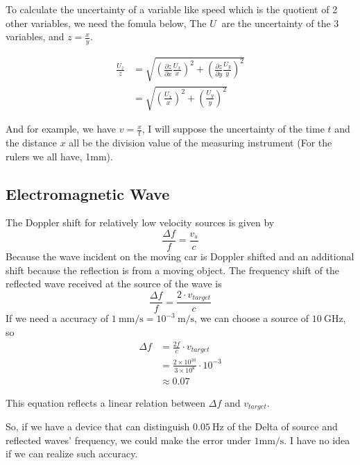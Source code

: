 \documentclass{article}
\begin{document}
To calculate the uncertainty of a variable like speed which is the quotient of 2 other variables, we need the fomula below,
The $U~$ are the uncertainty of the 3 variables, and $z = \frac{x}{y}$.


\begin{align}
    \frac{U_z}{z} & = \sqrt{ (\frac{\partial z}{\partial x} \frac{U_x}{x})^2 +  (\frac{\partial z}{\partial y} \frac{U_y}{y})^2} \label{fomula} \\
                  & = \sqrt{ ( \frac{U_x}{x})^2 +  (\frac{U_y}{y})^2}
\end{align}

And for example, we have $v = \frac{x}{t}$, I will suppose the uncertainty of the time $t$ and the distance $x$ all be the division value of the measuring instrument (For the rulers we all have, 1mm).



\subsection{Electromagnetic Wave}
The Doppler shift for relatively low velocity sources is given by
\begin{equation}
    \frac{\Delta f}{f} = \frac{v_s}{c}
\end{equation}
Because the wave incident on the moving car is Doppler shifted and an additional shift because the reflection is from a moving object. The frequency shift of the reflected wave received at the source of the wave is
\begin{equation}
    \frac{\Delta f}{f} = \frac{2 \cdot v_{target}}{c}
\end{equation}
If we need a accuracy of $1~\mathrm{mm/s} = 10^{-3}~\mathrm{m/s}$, we can choose a source of $10~\mathrm{GHz}$, so
\begin{equation}
    \begin{aligned}
        \Delta f & = \frac{2f}{c} \cdot v_{target}                        \\
                 & = \frac{2 \times 10^{10}}{3\times10^{8}} \cdot 10^{-3} \\
                 & \approx 0.07
    \end{aligned}
\end{equation}

This equation reflects a linear relation between $\Delta f$ and $v_{target}$.

So, if we have a device that can distinguish $0.05~\mathrm{Hz}$ of the Delta of source and reflected waves' frequency, we could make the error under $1\mathrm{mm/s}$. I have no idea if we can realize such accuracy.
\end{document}
